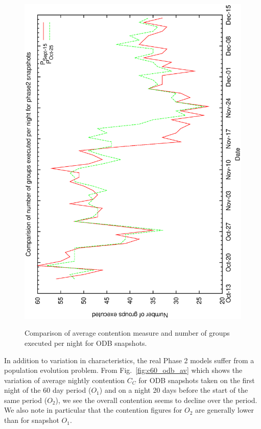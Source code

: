 \begin{figure}[h]
\begin{center}
{   \includegraphics[scale=0.5, angle=-90]{figures/c60_odb_ng.eps}  
   \label{fig:c60_odb_ng}
  }
  \caption[Comparison of average contention measure and number of groups executed per night for ODB snapshots]
{Comparison of average contention measure and number of groups executed per night for ODB snapshots.}
 \end{center}
\end{figure}

In addition to variation in characteristics, the real Phase 2 models suffer from a population evolution problem. From  Fig.~\ref{fig:c60_odb_av} which shows the variation of average nightly contention $C_C$ for ODB snapshots taken on the first night of the 60 day period ($O_1$) and on a night 20 days before the start of the same period ($O_2$), we see the overall contention seems to decline over the period. We also note in particular that the contention figures for $O_2$ are generally lower than for snapshot $O_1$. 

